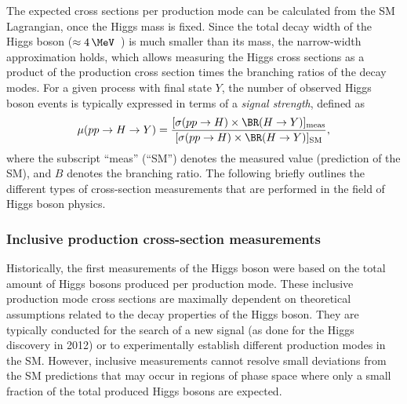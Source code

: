 The expected cross sections per production mode can be calculated from the SM Lagrangian, once the Higgs mass is fixed.
Since the total decay width of the Higgs boson ($\approx 4\,\MeV$~\cite{deFlorian:2016spz}) is much smaller than its mass, the narrow-width approximation holds, which allows measuring the Higgs cross sections as a product of the production cross section times the branching ratios of the decay modes.
For a given process with final state $Y$, the number of observed Higgs boson events is typically expressed in terms of a \emph{signal strength}, defined as 
\begin{equation}
  \label{eq:signal-strength}
  \mu(pp \to H \to Y) = \frac{ [ \sigma(pp \to H)  \times \BR(H \to Y) ]_\text{meas} } { [ \sigma(pp \to H) \times \BR(H \to Y) ]_\text{SM}},
\end{equation}
where the subscript ``meas'' (``SM'') denotes the measured value (prediction of the SM), and $B$ denotes the branching ratio. 
The following briefly outlines the different types of cross-section measurements that are performed in the field of Higgs boson physics. 


\subsubsection{Inclusive production cross-section measurements}
Historically, the first measurements of the Higgs boson were based on the total amount of Higgs bosons produced per production mode.
These inclusive production mode cross sections are maximally dependent on theoretical assumptions related to the decay properties of the Higgs boson.
They are typically conducted for the search of a new signal (as done for the Higgs discovery in 2012) or to experimentally establish different production modes in the SM.
However, inclusive measurements cannot resolve small deviations from the SM predictions that may occur in regions of phase space where only a small fraction of the total produced Higgs bosons are expected.

